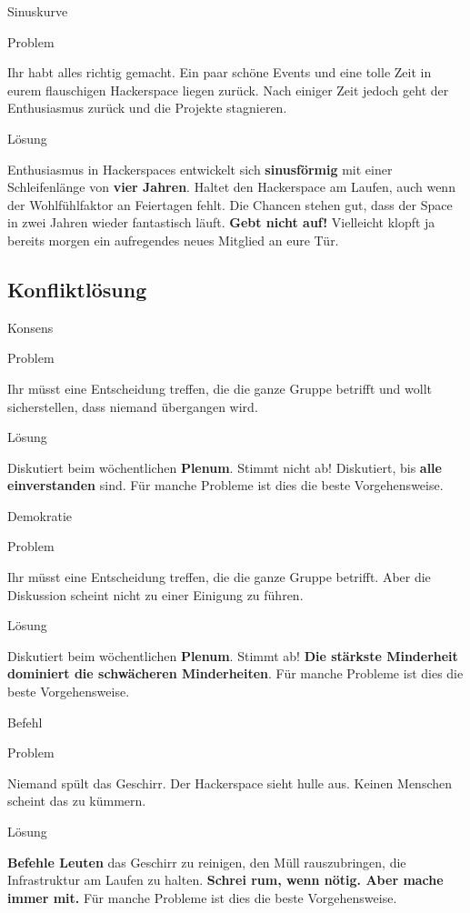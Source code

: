\documentclass[aspectratio=1610]{beamer}
\newcommand{\pattern}[2]{
  \begin{alertblock}{Problem}
    #1
  \end{alertblock}
  \pause
  \begin{exampleblock}{Lösung}
    #2
  \end{exampleblock}
}
\begin{document}
  \begin{frame}{Sinuskurve}
    \pattern{
      Ihr habt alles richtig gemacht. Ein paar schöne Events und eine tolle
      Zeit in eurem flauschigen Hackerspace liegen zurück. Nach einiger Zeit
      jedoch geht der Enthusiasmus zurück und die Projekte stagnieren.
    }{
      Enthusiasmus in Hackerspaces entwickelt sich \textbf{sinusförmig} mit einer
      Schleifenlänge von \textbf{vier Jahren}. Haltet den Hackerspace am Laufen,
      auch wenn der Wohlfühlfaktor an Feiertagen fehlt. Die Chancen stehen gut,
      dass der Space in zwei Jahren wieder fantastisch läuft. \textbf{Gebt nicht
      auf!} Vielleicht klopft ja bereits morgen ein aufregendes neues Mitglied
      an eure Tür.
    }
  \end{frame}

  \subsection{Konfliktlösung}

  \begin{frame}{Konsens}
    \pattern{
      Ihr müsst eine Entscheidung treffen, die die ganze Gruppe betrifft und
      wollt sicherstellen, dass niemand übergangen wird.
    }{
      Diskutiert beim wöchentlichen \textbf{Plenum}. Stimmt nicht ab!
      Diskutiert, bis \textbf{alle einverstanden} sind. Für manche Probleme ist
      dies die beste Vorgehensweise.
    }
  \end{frame}

  \begin{frame}{Demokratie}
    \pattern{
      Ihr müsst eine Entscheidung treffen, die die ganze Gruppe betrifft.
      Aber die Diskussion scheint nicht zu einer Einigung zu führen.
    }{
      Diskutiert beim wöchentlichen \textbf{Plenum}. Stimmt ab!
      \textbf{Die stärkste Minderheit dominiert die schwächeren Minderheiten}.
      Für manche Probleme ist dies die beste Vorgehensweise.
    }
  \end{frame}

  \begin{frame}{Befehl}
    \pattern{
      Niemand spült das Geschirr. Der Hackerspace sieht hulle aus. Keinen
      Menschen scheint das zu kümmern.
    }{
      \textbf{Befehle Leuten} das Geschirr zu reinigen, den Müll rauszubringen,
      die Infrastruktur am Laufen zu halten. \textbf{Schrei rum, wenn nötig.
      Aber mache immer mit.} Für manche Probleme ist dies die beste
      Vorgehensweise.
    }
  \end{frame}
\end{document}
